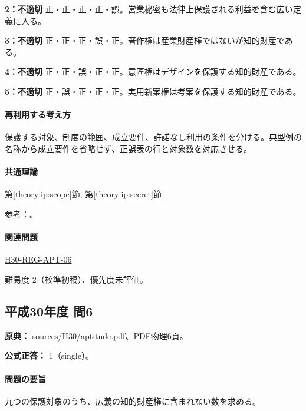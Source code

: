 \noindent\textbf{2：不適切} 正・正・正・正・誤。営業秘密も法律上保護される利益を含む広い定義に入る。\par

\noindent\textbf{3：不適切} 正・正・正・誤・正。著作権は産業財産権ではないが知的財産である。\par

\noindent\textbf{4：不適切} 正・正・誤・正・正。意匠権はデザインを保護する知的財産である。\par

\noindent\textbf{5：不適切} 正・誤・正・正・正。実用新案権は考案を保護する知的財産である。\par

\paragraph{再利用する考え方} 保護する対象、制度の範囲、成立要件、許諾なし利用の条件を分ける。典型例の名称から成立要件を省略せず、正誤表の行と対象数を対応させる。

\paragraph{共通理論} \hyperref[theory:ip:scope]{第\ref*{theory:ip:scope}節}, \hyperref[theory:ip:secret]{第\ref*{theory:ip:secret}節}

\par 参考：\cite{ip_basic_act,ip_broad_scope}。

\paragraph{関連問題} \hyperref[q:h30-reg-apt-06]{H30-REG-APT-06}

\par 難易度 2（校準初稿）、優先度未評価。

\subsection{平成30年度 問6}
\label{q:h30-reg-apt-06}

\noindent\textbf{原典：} sources/H30/aptitude.pdf、PDF物理6頁。

\textbf{公式正答：} 1（single）。

\paragraph{問題の要旨} 九つの保護対象のうち、広義の知的財産権に含まれない数を求める。

